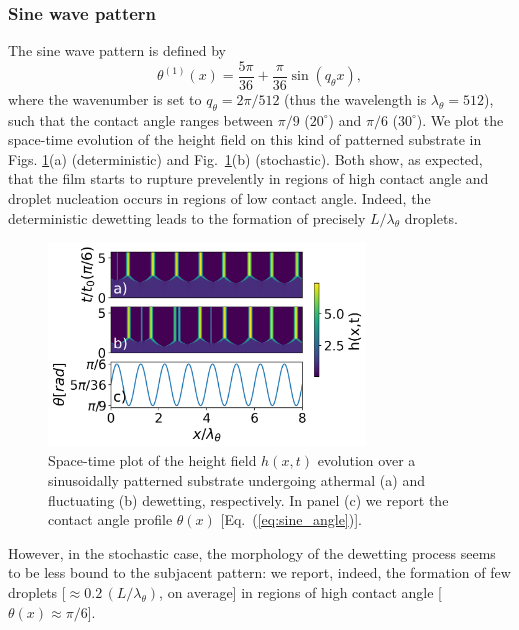 \subsubsection{Sine wave pattern}\label{subsubsec:sine}
The sine wave pattern is defined by
\begin{equation}\label{eq:sine_angle}
    {\theta^{(1)}}(x) = \frac{5\pi}{36} + \frac{\pi}{36} \sin\left(q_{\theta} x\right),
\end{equation}
where the wavenumber is set to $q_{\theta} = 2\pi/512$ (thus the wavelength is $\lambda_{\theta}=512$), such that the contact angle ranges between $\pi/9$ ($20^{\circ}$) and $\pi/6$ ($30^{\circ}$).
We plot the space-time evolution of the height field on this kind of patterned substrate in Figs. \ref{fig:patterned_sine8_difference_20-30}(a) (deterministic) and  Fig.~\ref{fig:patterned_sine8_difference_20-30}(b) (stochastic). 
Both show, as expected, that the film starts to rupture prevelently in regions of high contact angle and droplet nucleation occurs in regions of low contact angle. 
Indeed, the deterministic dewetting leads to the formation of precisely $L/\lambda_{\theta}$ droplets.
\begin{figure}
    \centering
    \includegraphics[width=0.75\textwidth]{graphics/spacedepCA_['sine', '1e7', '10', 25, '9_3', 10000000.0]_v2.png}
    \caption{Space-time plot of the height field $h(x,t)$ evolution over a sinusoidally patterned substrate undergoing athermal 
    (a) and fluctuating (b) dewetting, respectively. In panel (c) we report the contact angle profile $\theta(x)$ [Eq.~(\ref{eq:sine_angle})].} 
    \label{fig:patterned_sine8_difference_20-30}
\end{figure}
However, in the stochastic case, the morphology of the dewetting process seems to be less bound to the subjacent pattern: we report, indeed, the formation of few droplets [$\approx 0.2 \, (L/\lambda_{\theta})$, on average] in regions of high contact angle [$\theta(x) \approx \pi/6$].
